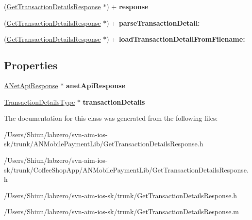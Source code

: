 \begin{DoxyCompactItemize}
\item 
\hypertarget{interface_get_transaction_details_response_a718b09c76c4de2c16ccf6411bbaefb4a}{
(\hyperlink{interface_get_transaction_details_response}{GetTransactionDetailsResponse} $\ast$) + {\bfseries response}}
\label{interface_get_transaction_details_response_a718b09c76c4de2c16ccf6411bbaefb4a}

\item 
\hypertarget{interface_get_transaction_details_response_ab71ba99b156aa708131d8b6fa44d6f23}{
(\hyperlink{interface_get_transaction_details_response}{GetTransactionDetailsResponse} $\ast$) + {\bfseries parseTransactionDetail:}}
\label{interface_get_transaction_details_response_ab71ba99b156aa708131d8b6fa44d6f23}

\item 
\hypertarget{interface_get_transaction_details_response_a1d63918e7dc780c0b997caad8bb637d5}{
(\hyperlink{interface_get_transaction_details_response}{GetTransactionDetailsResponse} $\ast$) + {\bfseries loadTransactionDetailFromFilename:}}
\label{interface_get_transaction_details_response_a1d63918e7dc780c0b997caad8bb637d5}

\end{DoxyCompactItemize}
\subsection*{Properties}
\begin{DoxyCompactItemize}
\item 
\hypertarget{interface_get_transaction_details_response_af154a74ff9d8b9a8fd29b68486bbf8f5}{
\hyperlink{interface_a_net_api_response}{ANetApiResponse} $\ast$ {\bfseries anetApiResponse}}
\label{interface_get_transaction_details_response_af154a74ff9d8b9a8fd29b68486bbf8f5}

\item 
\hypertarget{interface_get_transaction_details_response_a809dbf63d2c066b906f16bb1134165b1}{
\hyperlink{interface_transaction_details_type}{TransactionDetailsType} $\ast$ {\bfseries transactionDetails}}
\label{interface_get_transaction_details_response_a809dbf63d2c066b906f16bb1134165b1}

\end{DoxyCompactItemize}


The documentation for this class was generated from the following files:\begin{DoxyCompactItemize}
\item 
/Users/Shiun/labzero/svn-\/aim-\/ios-\/sk/trunk/ANMobilePaymentLib/GetTransactionDetailsResponse.h\item 
/Users/Shiun/labzero/svn-\/aim-\/ios-\/sk/trunk/CoffeeShopApp/ANMobilePaymentLib/GetTransactionDetailsResponse.h\item 
/Users/Shiun/labzero/svn-\/aim-\/ios-\/sk/trunk/GetTransactionDetailsResponse.h\item 
/Users/Shiun/labzero/svn-\/aim-\/ios-\/sk/trunk/GetTransactionDetailsResponse.m\end{DoxyCompactItemize}
